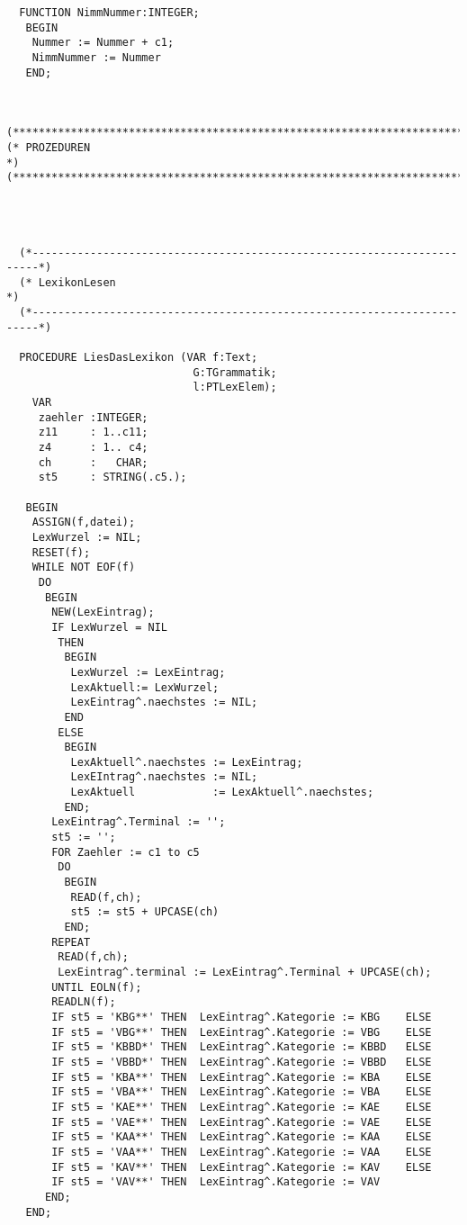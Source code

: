 \documentclass[12pt]{article}
\begin{document}
\begin{verbatim}
  FUNCTION NimmNummer:INTEGER;
   BEGIN
    Nummer := Nummer + c1;
    NimmNummer := Nummer
   END;



(***************************************************************************)
(* PROZEDUREN                                                              *)
(***************************************************************************)




  (*-----------------------------------------------------------------------*)
  (* LexikonLesen                                                          *)
  (*-----------------------------------------------------------------------*)

  PROCEDURE LiesDasLexikon (VAR f:Text;
                             G:TGrammatik;
                             l:PTLexElem);
    VAR
     zaehler :INTEGER;
     z11     : 1..c11;
     z4      : 1.. c4;
     ch      :   CHAR;
     st5     : STRING(.c5.);

   BEGIN
    ASSIGN(f,datei);
    LexWurzel := NIL;
    RESET(f);
    WHILE NOT EOF(f)
     DO
      BEGIN
       NEW(LexEintrag);
       IF LexWurzel = NIL
        THEN
         BEGIN
          LexWurzel := LexEintrag;
          LexAktuell:= LexWurzel;
          LexEintrag^.naechstes := NIL;
         END
        ELSE
         BEGIN
          LexAktuell^.naechstes := LexEintrag;
          LexEIntrag^.naechstes := NIL;
          LexAktuell            := LexAktuell^.naechstes;
         END;
       LexEintrag^.Terminal := '';
       st5 := '';
       FOR Zaehler := c1 to c5
        DO
         BEGIN
          READ(f,ch);
          st5 := st5 + UPCASE(ch)
         END;
       REPEAT
        READ(f,ch);
        LexEintrag^.terminal := LexEintrag^.Terminal + UPCASE(ch);
       UNTIL EOLN(f);
       READLN(f);
       IF st5 = 'KBG**' THEN  LexEintrag^.Kategorie := KBG    ELSE
       IF st5 = 'VBG**' THEN  LexEintrag^.Kategorie := VBG    ELSE
       IF st5 = 'KBBD*' THEN  LexEintrag^.Kategorie := KBBD   ELSE
       IF st5 = 'VBBD*' THEN  LexEintrag^.Kategorie := VBBD   ELSE
       IF st5 = 'KBA**' THEN  LexEintrag^.Kategorie := KBA    ELSE
       IF st5 = 'VBA**' THEN  LexEintrag^.Kategorie := VBA    ELSE
       IF st5 = 'KAE**' THEN  LexEintrag^.Kategorie := KAE    ELSE
       IF st5 = 'VAE**' THEN  LexEintrag^.Kategorie := VAE    ELSE
       IF st5 = 'KAA**' THEN  LexEintrag^.Kategorie := KAA    ELSE
       IF st5 = 'VAA**' THEN  LexEintrag^.Kategorie := VAA    ELSE
       IF st5 = 'KAV**' THEN  LexEintrag^.Kategorie := KAV    ELSE
       IF st5 = 'VAV**' THEN  LexEintrag^.Kategorie := VAV
      END;
   END;



\end{verbatim}
\end{document}
